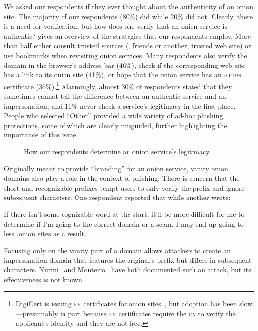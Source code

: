 We asked our respondents if they ever thought about the authenticity of an onion
site.  The majority of our respondents (80\%) did while 20\% did not.  Clearly,
there is a need for verification, but how does one verify that an onion service
is authentic?   gives an overview of the
strategies that our respondents employ.  More than half either consult trusted
sources (\eg, friends or another, trusted web site) or use bookmarks when
revisiting onion services.  Many respondents also verify the domain in the
browser's address bar (46\%), check if the corresponding web site has a link to
its onion site (41\%), or hope that the onion service has an \textsc{https}
certificate (36\%).\footnote{DigiCert is issuing \textsc{ev} certificates for
onion sites~\cite{DigiCert2015a}, but adoption has been slow---presumably in part
because \textsc{ev} certificates require the \textsc{ca} to verify the
applicant's identity and they are not free.}  Alarmingly, almost 30\% of
respondents stated that they sometimes cannot tell the difference between an
authentic service and an impersonation, and 11\% never check a service's
legitimacy in the first place.  People who selected ``Other'' provided a wide
variety of ad-hoc phishing protections, some of which are clearly misguided,
further highlighting the importance of this issue.

\begin{figure}[t]
    \centering
    
    \caption{How our respondents determine an onion service's legitimacy.}
    \label{fig:determining-legitimacy}
\end{figure}

Originally meant to provide ``branding'' for an onion service, vanity onion
domains also play a role in the context of phishing.  There is concern that the
short and recognizable prefixes tempt users to only verify the prefix and ignore
subsequent characters.  One respondent reported that  while another wrote:

\begin{displayquote}
If there isn't some cognizable word at the start, it'll be more difficult for me
to determine if I'm going to the correct domain or a scam. I may end up going to
less .onion sites as a result.
\end{displayquote}

Focusing only on the vanity part of a domain allows attackers to create an
impersonation domain that features the original's prefix but differs in
subsequent characters.  Nurmi~\cite{Nurmi2015a} and
Monteiro~\cite{Monteiro2016a} have both documented such an attack, but its
effectiveness is not known.

